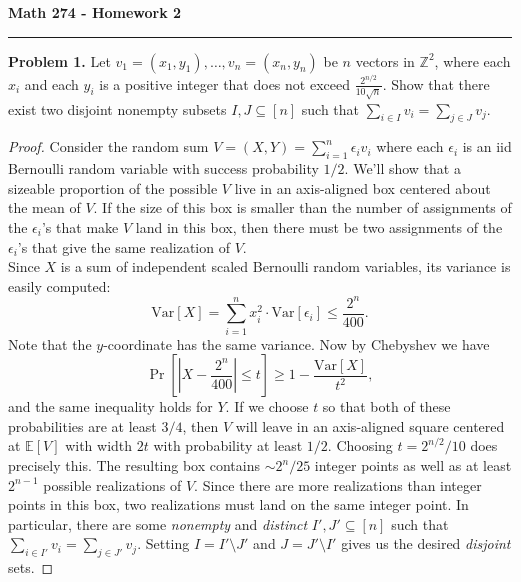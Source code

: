 \documentclass[11pt,letterpaper]{report}
\newcommand{\integers}{\mathbb{Z}}
\newcommand{\Var}{\text{Var}}
\newcommand{\E}{\mathbb{E}}
\begin{document}
\begin{center}
{\bf \Large Math 274 - Homework 2}
\vspace{0.2cm}
\hrule
\end{center}

\noindent\textbf{Problem 1. }
Let $v_1 = (x_1, y_1), \ldots, v_n = (x_n, y_n)$ be $n$ vectors in $\integers^2$, where each $x_i$ and each $y_i$ is a positive integer that does not exceed $\frac{2^{n/2}}{10\sqrt{n}}$.
Show that there exist two disjoint nonempty subsets $I, J\subseteq [n]$ such that $\sum_{i\in I}v_i = \sum_{j\in J}v_j$.

\begin{proof}
    Consider the random sum $V = (X, Y) = \sum_{i=1}^n \epsilon_iv_i$ where each $\epsilon_i$ is an iid Bernoulli random variable with success probability $1/2$.
    We'll show that a sizeable proportion of the possible $V$ live in an axis-aligned box centered about the mean of $V$.
    If the size of this box is smaller than the number of assignments of the $\epsilon_i$'s that make $V$ land in this box, then there must be two assignments of the $\epsilon_i$'s that give the same realization of $V$.\\

    Since $X$ is a sum of independent scaled Bernoulli random variables, its variance is easily computed:
    \[
        \Var[X] = \sum_{i=1}^nx_i^2\cdot \Var[\epsilon_i] \leq \frac{2^n}{400}.
    \]
    Note that the $y$-coordinate has the same variance.
    Now by Chebyshev we have
    \[\Pr\left[ \left|X - \frac{2^n}{400}\right| \leq t\right] \geq 1-\frac{\Var[X]}{t^2},
    \]
    and the same inequality holds for $Y$.
    If we choose $t$ so that both of these probabilities are at least $3/4$, then $V$ will leave in an axis-aligned square centered at $\E[V]$ with width $2t$ with probability at least $1/2$.
    Choosing $t = 2^{n/2}/10$ does precisely this.
    The resulting box contains $\sim 2^n/25$ integer points as well as at least $2^{n-1}$ possible realizations of $V$.
    Since there are more realizations than integer points in this box, two realizations must land on the same integer point.
    In particular, there are some \textit{nonempty} and \textit{distinct} $I', J' \subseteq [n]$ such that $\sum_{i\in I'}v_i = \sum_{j\in J'}v_j$. Setting $I = I'\setminus J'$ and $J = J'\setminus I'$ gives us the desired \textit{disjoint} sets.
\end{proof}
\end{document}
